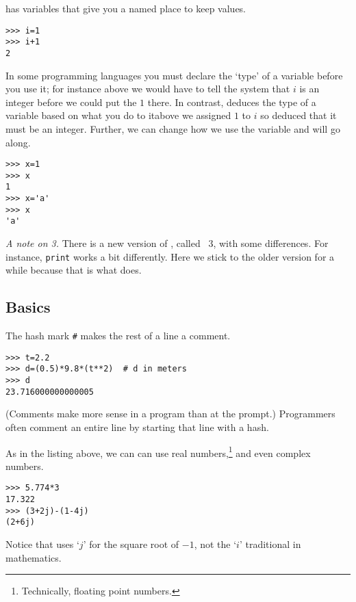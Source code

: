 \python{} has variables that give you a named place to keep values.
\begin{lstlisting}[style=python]
>>> i=1
>>> i+1
2
\end{lstlisting}
In some programming languages you must declare the `type' of a variable
before you use it; for instance above we would have to tell the system
that $i$ is an integer before we could put the $1$ there.
In contrast, \python{} deduces the type of a variable 
based on what you do to it\Dash above we assigned $1$ to $i$ 
so \python{} deduced that it must be an integer.
Further, we can change how we use the variable and \python{} will 
go along.
\begin{lstlisting}[style=python]
>>> x=1
>>> x
1
>>> x='a'
>>> x
'a'
\end{lstlisting}

\textit{A note on \python{} 3.}
There is a new version of \python{}, called \python~3, with some differences.
For instance, \lstinline[style=inline]!print! works a bit differently.
Here we stick to the older version for a while
because that is what \sage{} does.



\subsection{Basics}
The hash mark \lstinline[style=inline]!#! makes the rest of a line a comment.
\begin{lstlisting}[style=python]
>>> t=2.2
>>> d=(0.5)*9.8*(t**2)  # d in meters
>>> d
23.716000000000005
\end{lstlisting}
(Comments make more sense in a program than at the prompt.)
Programmers often comment an entire line by starting 
that line with a hash. 

As in the listing above, we can can use real 
numbers,\footnote{Technically, floating point numbers.} 
and even complex numbers.
\begin{lstlisting}[style=python]
>>> 5.774*3
17.322
>>> (3+2j)-(1-4j)
(2+6j)
\end{lstlisting}
Notice that \python{} uses `$j$' for the square
root of $-1$, not the `$i$' traditional in mathematics.

